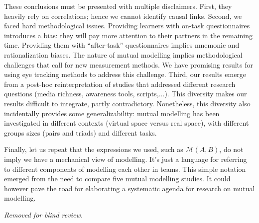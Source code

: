 \documentclass[natbib]{svjour3}
\newcommand{\gmodel}[2]{{$\mathcal{M}(#1, #2)$}}
\begin{document}
These conclusions must be presented with multiple disclaimers. First, they
heavily rely on correlations; hence we cannot identify causal links. Second, we
faced hard methodological issues. Providing learners with on-task questionnaires
introduces a bias: they will pay more attention to their partners in the
remaining time. Providing them with ``after-task'' questionnaires implies
mnemonic and rationalization biases. The nature of mutual modelling implies
methodological challenges that call for new measurement methods. We have
promising results for using eye tracking methods to address this challenge.
Third, our results emerge from a post-hoc reinterpretation of studies that
addressed different research questions (media richness, awareness tools,
scripts,...). This diversity makes our results difficult to integrate, partly
contradictory. Nonetheless, this diversity also incidentally provides some
generalizability: mutual modelling has been investigated in different contexts
(virtual space versus real space), with different groups sizes (pairs and
triads) and different tasks.

Finally, let us repeat that the expressions we used, such as \gmodel{A}{B}, do
not imply we have a mechanical view of modelling. It's just a language for
referring to different components of modelling each other in teams.  This simple
notation emerged from the need to compare five mutual modelling studies. It
could however pave the road for elaborating a systematic agenda for research on
mutual modelling.

\begin{acknowledgements}


\textit{Removed for blind review.}

\end{acknowledgements}



\end{document}
